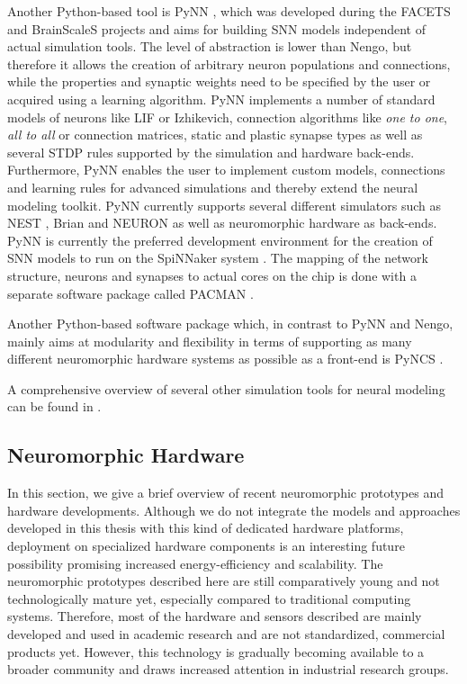 Another Python-based tool is \ac{PyNN} \parencite{Davies2010}, which was developed during the \ac{FACETS}  and \ac{BrainScaleS}  projects and aims for building \ac{SNN} models independent of actual simulation tools.
The level of abstraction is lower than \ac{Nengo}, but therefore it allows the creation of arbitrary neuron populations and connections, while the properties and synaptic weights need to be specified by the user or acquired using a learning algorithm.
\ac{PyNN} implements a number of standard models of neurons like \ac{LIF} or Izhikevich, connection algorithms like \emph{one to one}, \emph{all to all} or connection matrices, static and plastic synapse types as well as several \ac{STDP} rules supported by the simulation and hardware back-ends.
Furthermore, \ac{PyNN} enables the user to implement custom models, connections and learning rules for advanced simulations and thereby extend the neural modeling toolkit.
\ac{PyNN} currently supports several different simulators such as \ac{NEST} \parencite{Gewaltig2007}, Brian \parencite{Goodman2009} and NEURON  \parencite{Carnevale2009} as well as neuromorphic hardware as back-ends.
\ac{PyNN} is currently the preferred development environment for the creation of \ac{SNN} models to run on the \ac{SpiNNaker} system \parencite{Furber2014}.
The mapping of the network structure, neurons and synapses to actual cores on the chip is done with a separate software package called \ac{PACMAN} \parencite{Galluppi2012}.

Another Python-based software package which, in contrast to \ac{PyNN} and \ac{Nengo}, mainly aims at modularity and flexibility in terms of supporting as many different neuromorphic hardware systems as possible as a front-end is \ac{PyNCS} \parencite{Stefanini2014}.

A comprehensive overview of several other simulation tools for neural modeling can be found in \textcite{Brette2007}.

\subsection{Neuromorphic Hardware}
\label{sec:neuromorphic_HW}

In this section, we give a brief overview of recent neuromorphic prototypes and hardware developments.
Although we do not integrate the models and approaches developed in this thesis with this kind of dedicated hardware platforms, deployment on specialized hardware components is an interesting future possibility promising increased energy-efficiency and scalability.
The neuromorphic prototypes described here are still comparatively young and not technologically mature yet, especially compared to traditional computing systems.
Therefore, most of the hardware and sensors described are mainly developed and used in academic research and are not standardized, commercial products yet.
However, this technology is gradually becoming available to a broader community and draws increased attention in industrial research groups.

